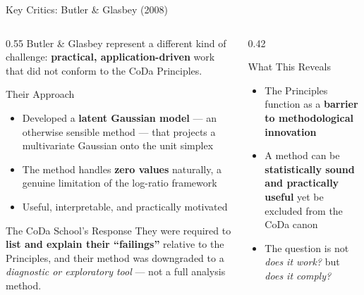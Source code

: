 \begin{frame}{Key Critics: Butler \& Glasbey (2008)}

\begin{columns}[T]
  \begin{column}{0.55\textwidth}
    Butler \& Glasbey represent a different kind of challenge:
    \textbf{practical, application-driven} work that did not
    conform to the CoDa Principles.

    \vspace{0.3cm}
    \begin{block}{Their Approach}
      \begin{itemize}
        \item Developed a \textbf{latent Gaussian model} — an
              otherwise sensible method — that projects a
              multivariate Gaussian onto the unit simplex
        \item The method handles \textbf{zero values} naturally,
              a genuine limitation of the log-ratio framework
        \item Useful, interpretable, and practically motivated
      \end{itemize}
    \end{block}

    \vspace{0.2cm}
    \begin{alertblock}{The CoDa School's Response}
      They were required to \textbf{list and explain their
      ``failings''} relative to the Principles, and their method
      was downgraded to a \emph{diagnostic or exploratory tool}
      — not a full analysis method.
    \end{alertblock}
  \end{column}

  \begin{column}{0.42\textwidth}
    \begin{block}{What This Reveals}
      \begin{itemize}
        \item The Principles function as a \textbf{barrier to
              methodological innovation}
        \item A method can be \textbf{statistically sound and
              practically useful} yet be excluded from the CoDa
              canon
        \item The question is not \emph{does it work?} but
              \emph{does it comply?}
      \end{itemize}
    \end{block}


\end{column}
\end{columns}
\end{frame}
